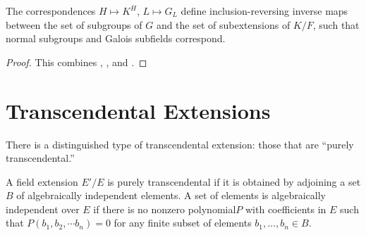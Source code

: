 \begin{theorem} The correspondences $H \mapsto K^H$, $L \mapsto G_L$ define
inclusion-reversing inverse maps between the set of subgroups of $G$ and the
set of subextensions of $K/F$, such that normal subgroups and Galois subfields
correspond.
\label{fundamental_theorem}
\end{theorem}

\begin{proof} This combines , , and .
\end{proof}


\section{Transcendental Extensions}


There is a distinguished type of transcendental extension: those that are
``purely transcendental.'' 
\begin{definition} A field extension $E'/E$ is purely transcendental if it is
obtained by adjoining a set $B$ of algebraically independent elements. A set of
elements is algebraically independent over $E$ if there is no nonzero polynomial$P$
with coefficients in $E$ such
that $P(b_1,b_2,\cdots b_n)=0$ for any finite subset of elements $b_1, \dots,
b_n \in B$.
\end{definition}

